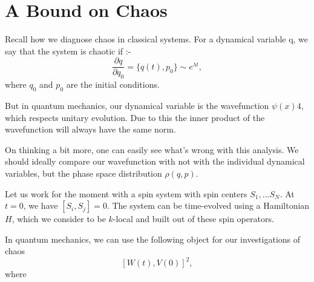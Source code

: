 
\chapter{A Bound on Chaos} %

\label{Chapter6} %


Recall how we diagnose chaos in classical systems. For a dynamical variable q, we say that the system is chaotic if :- $$\frac{\partial q}{\partial q_0} = \{q(t),p_0 \} \sim e^{\lambda t},$$ where $q_0$ and $p_0$ are the initial conditions.

But in quantum mechanics, our dynamical variable is the wavefunction $\psi(x)4$, which respects unitary evolution. Due to this the inner product of the wavefunction will always have the same norm.

On thinking a bit more, one can easily see what's wrong with this analysis. We should ideally compare our wavefunction with not with the individual dynamical variables, but the phase space distribution $\rho(q,p)$.

Let us work for the moment with a spin system with spin centers $S_1, \ldots S_N$. At $t=0$, we have $[S_i,S_j]=0$. The system can be time-evolved using a Hamiltonian $H$, which we consider to be $k$-local and built out of these spin operators.


In quantum mechanics, we can use the following object for our investigations of chaos $$[W(t),V(0)]^2,$$ where 

